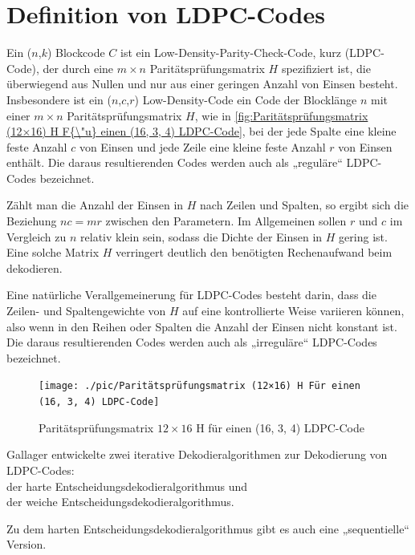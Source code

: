 \chapter{Definition von LDPC-Codes}
\begin{definition}
    Ein (\(n\),\(k\)) Blockcode \(C\) ist ein Low-Density-Parity-Check-Code, kurz (LDPC-Code), der durch eine $m \times n$ Paritätsprüfungsmatrix $H$ 
    spezifiziert ist, die überwiegend aus Nullen und nur aus einer geringen Anzahl von Einsen besteht. 
    Insbesondere ist ein (\(n\),\(c\),\(r\)) Low-Density-Code ein Code der Blocklänge $n$ mit einer $m \times n$ Paritätsprüfungsmatrix $H$,
    wie in \autoref{fig:Paritätsprüfungsmatrix (12×16) H F{\"u} einen (16, 3, 4) LDPC-Code}, 
    bei der jede Spalte eine kleine feste Anzahl $c$ von Einsen und jede Zeile eine kleine feste Anzahl $r$ von Einsen enthält.
    Die daraus resultierenden Codes werden auch als „reguläre“ LDPC-Codes bezeichnet.
    
    Zählt man die Anzahl der Einsen in $H$ nach Zeilen und Spalten, so ergibt sich die Beziehung $nc = mr$ zwischen den Parametern. Im Allgemeinen sollen $r$ und $c$ im Vergleich zu $n$ relativ klein sein, sodass die Dichte der Einsen in $H$ gering ist. Eine solche Matrix $H$ verringert deutlich den benötigten Rechenaufwand beim dekodieren.
    
    Eine natürliche Verallgemeinerung für LDPC-Codes besteht darin, dass die Zeilen- und Spaltengewichte von $H$ auf eine kontrollierte Weise variieren können, also wenn in den Reihen oder Spalten die Anzahl der Einsen nicht konstant ist. Die daraus resultierenden Codes werden auch als „irreguläre“ LDPC-Codes bezeichnet.

    
    \begin{figure}[!ht]
        \centering
         {\texttt{[image: ./pic/Paritätsprüfungsmatrix (12×16) H Für einen (16, 3, 4) LDPC-Code]}}
          \caption{ Paritätspr{\"u}fungsmatrix \(12\times16\) H für einen (16, 3, 4) LDPC-Code}
        \label{fig:Paritätsprüfungsmatrix (12×16) H F{\"u} einen (16, 3, 4) LDPC-Code}
    \end{figure}
    
    
     Gallager entwickelte zwei iterative Dekodieralgorithmen zur Dekodierung von LDPC-Codes:\\
     der harte Entscheidungsdekodieralgorithmus und\\
     der weiche Entscheidungsdekodieralgorithmus.
    
     Zu dem harten Entscheidungsdekodieralgorithmus gibt es auch eine „sequentielle“ Version.
    \cite[S. 11]{huffman}
\end{definition}
\pagebreak
    
